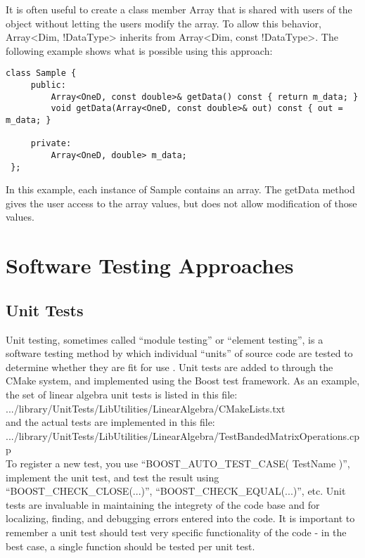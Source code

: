 It is often useful to create a class member Array that is shared with users of
the object without letting the users modify the array. To allow this behavior,
Array<Dim, !DataType> inherits from Array<Dim, const !DataType>. The following
example shows what is possible using this approach:
\begin{lstlisting}[style=C++Style]
 class Sample {
     public:
         Array<OneD, const double>& getData() const { return m_data; }
         void getData(Array<OneD, const double>& out) const { out = m_data; }

     private:
         Array<OneD, double> m_data;
 };
\end{lstlisting}
In this example, each instance of Sample contains an array. The getData
method gives the user access to the array values, but does not allow
modification of those values.


\section{Software Testing Approaches}

\subsection{Unit Tests}

Unit testing, sometimes called ``module testing'' or ``element testing'', is a
software testing method by which individual ``units'' of source code
are tested to determine whether they are fit for use
\cite{KFN-testing}.  Unit tests are added to {\nek} through the
CMake system, and implemented using the Boost test framework.
As an example, the set of linear algebra unit tests is
listed in this file: \\

.../library/UnitTests/LibUtilities/LinearAlgebra/CMakeLists.txt \\

and the actual tests are implemented in this file: \\

.../library/UnitTests/LibUtilities/LinearAlgebra/TestBandedMatrixOperations.cpp \\

To register a new test, you use ``BOOST\_AUTO\_TEST\_CASE( TestName )'',
implement the unit test, and test the result using
``BOOST\_CHECK\_CLOSE(...)'', ``BOOST\_CHECK\_EQUAL(...)'', etc. Unit
tests are invaluable in maintaining the integrety of the code base and
for localizing, finding, and debugging errors entered into the code. It is
important to remember a unit test should test very specific
functionality of the code - in the best case, a single function should be
tested per unit test. \\

